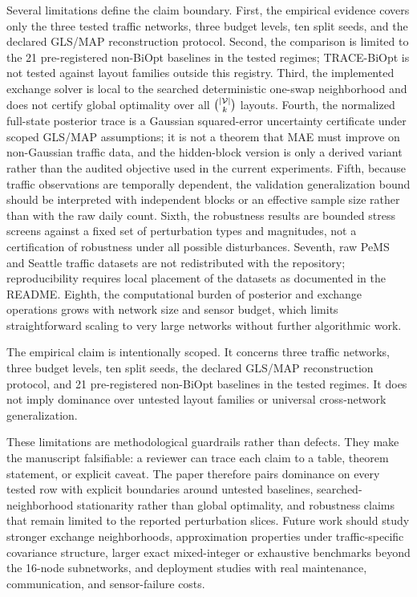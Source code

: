 Several limitations define the claim boundary. First, the empirical evidence covers only the three tested traffic networks, three budget levels, ten split seeds, and the declared GLS/MAP reconstruction protocol. Second, the comparison is limited to the 21 pre-registered non-BiOpt baselines in the tested regimes; TRACE-BiOpt is not tested against layout families outside this registry. Third, the implemented exchange solver is local to the searched deterministic one-swap neighborhood and does not certify global optimality over all $\binom{|\mathcal{V}|}{k}$ layouts. Fourth, the normalized full-state posterior trace is a Gaussian squared-error uncertainty certificate under scoped GLS/MAP assumptions; it is not a theorem that MAE must improve on non-Gaussian traffic data, and the hidden-block version is only a derived variant rather than the audited objective used in the current experiments. Fifth, because traffic observations are temporally dependent, the validation generalization bound should be interpreted with independent blocks or an effective sample size rather than with the raw daily count. Sixth, the robustness results are bounded stress screens against a fixed set of perturbation types and magnitudes, not a certification of robustness under all possible disturbances. Seventh, raw PeMS and Seattle traffic datasets are not redistributed with the repository; reproducibility requires local placement of the datasets as documented in the README. Eighth, the computational burden of posterior and exchange operations grows with network size and sensor budget, which limits straightforward scaling to very large networks without further algorithmic work.

The empirical claim is intentionally scoped. It concerns three traffic networks, three budget levels, ten split seeds, the declared GLS/MAP reconstruction protocol, and 21 pre-registered non-BiOpt baselines in the tested regimes. It does not imply dominance over untested layout families or universal cross-network generalization.

These limitations are methodological guardrails rather than defects. They make
the manuscript falsifiable: a reviewer can trace each claim to a table,
theorem statement, or explicit caveat. The paper therefore pairs dominance on
every tested row with explicit boundaries around untested baselines,
searched-neighborhood stationarity rather than global optimality, and
robustness claims that remain limited to the reported perturbation slices.
Future work should study stronger exchange
neighborhoods, approximation properties under traffic-specific covariance
structure, larger exact mixed-integer or exhaustive benchmarks beyond the
16-node subnetworks, and deployment studies with real maintenance,
communication, and sensor-failure costs.

